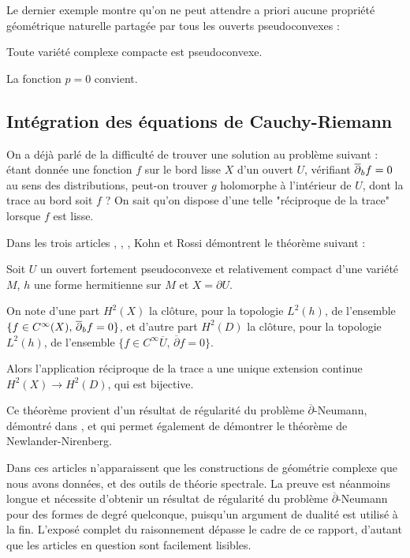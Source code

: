 Le dernier exemple montre qu'on ne peut attendre a priori aucune propriété géométrique naturelle partagée par tous les ouverts pseudoconvexes :
\begin{exemple}
Toute variété complexe compacte est pseudoconvexe.
\end{exemple}
\begin{preuve}
La fonction $p=0$ convient.
\end{preuve}
\subsection{Intégration des équations de Cauchy-Riemann}
On a déjà parlé de la difficulté de trouver une solution au problème suivant : étant donnée une fonction $f$ sur le bord lisse $X$ d'un ouvert $U$, vérifiant $\overline{\partial}_b f =0$ au sens des distributions, peut-on trouver $g$ holomorphe à l'intérieur de $U$, dont la trace au bord soit $f$ ? On sait qu'on dispose d'une telle "réciproque de la trace" lorsque $f$ est lisse.

Dans les trois articles \cite{kohn1963harmonic}, \cite{kohn1964harmonic}, \cite{kohn1965extension}, Kohn et Rossi démontrent le théorème suivant :
\begin{theorem}[Kohn]\label{thm:annexe}
Soit $U$ un ouvert fortement pseudoconvexe et relativement compact d'une variété $M$, $h$ une forme hermitienne sur $M$ et $X=\partial U$.

On note d'une part $H^2(X)$ la clôture, pour la topologie $L^2(h)$, de l'ensemble $\{f \in C^{\infty}(X),\,\overline{\partial}_b f =0\}$, et d'autre part $H^2(D)$ la clôture, pour la topologie $L^2(h)$, de l'ensemble $\{f \in C^{\infty}{\overline{U}},\,\overline{\partial}f =0\}$.

Alors l'application réciproque de la trace a une unique extension continue $H^2(X)\to H^2(D)$, qui est bijective.
\end{theorem}
Ce théorème provient d'un résultat de régularité du problème $\overline{\partial}$-Neumann, démontré dans \cite{kohn1964harmonic}, et qui permet également de démontrer le théorème de Newlander-Nirenberg.

Dans ces articles n'apparaissent que les constructions de géométrie complexe que nous avons données, et des outils de théorie spectrale. La preuve est néanmoins longue et nécessite d'obtenir un résultat de régularité du problème $\overline{\partial}$-Neumann pour des formes de degré quelconque, puisqu'un argument de dualité est utilisé à la fin. L'exposé complet du raisonnement dépasse le cadre de ce rapport, d'autant que les articles en question sont facilement lisibles.

